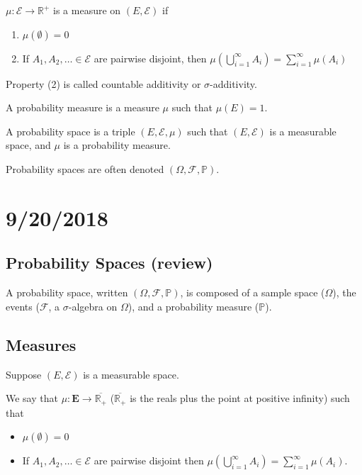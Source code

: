 \documentclass[english, course]{Notes}
\begin{document}
\begin{definition}
$\mu: \mathcal{E} \to \mathbb{R^+}$ is a measure on $(E, \mathcal{E})$ if
\begin{enumerate}
	\item $\mu(\emptyset) = 0$
	\item If $A_1, A_2, \dots \in \mathcal{E}$ are pairwise disjoint, then $\mu(\bigcup^\infty_{i = 1} A_i) = \sum^\infty_{i = 1}\mu(A_i)$
\end{enumerate}
\end{definition}


Property (2) is called countable additivity or $\sigma$-additivity.\\

\begin{definition}
A probability measure is a measure $\mu$ such that $\mu(E) = 1$.
\end{definition}

\begin{definition}
A probability space is a triple $(E, \mathcal{E}, \mu)$ such that $(E, \mathcal{E})$ is a measurable space, and $\mu$ is a probability measure.
\end{definition}

Probability spaces are often denoted $(\Omega, \mathcal{F}, \mathbb{P})$.

\section{9/20/2018}

\subsection{Probability Spaces (review)}

A probability space, written $(\Omega, \mathcal{F}, \mathbb{P})$, is composed of a sample space ($\Omega$), the events ($\mathcal{F}$, a $\sigma$-algebra on $\Omega$), and a probability measure ($\mathbb{P}$).

\subsection{Measures}

Suppose $(E, \mathcal{E})$ is a measurable space.\\

\begin{definition}
We say that $\mu: \mathbf{E} \to \overline{\mathbb{R}_+}$ ($\overline{\mathbb{R}_+}$ is the reals plus the point at positive infinity) such that

\begin{itemize}
	\item $\mu(\emptyset) = 0$
	\item If $A_1, A_2, \dots \in \mathcal{E}$ are pairwise disjoint then $\mu(\bigcup^\infty_{i = 1} A_i) = \sum^\infty_{i=1} \mu(A_i)$.
\end{itemize}
\end{definition}
\end{document}
